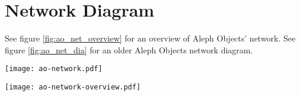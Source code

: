 \section{Network Diagram}
See figure \ref{fig:ao_net_overview} for an overview of Aleph Objects' network.
See figure \ref{fig:ao_net_dia} for an older Aleph Objects network diagram.

\begin{sidewaysfigure}[p]
\texttt{[image: ao-network.pdf]}
 \caption{Network Diagram}
 \label{fig:ao_net_dia}
\end{sidewaysfigure}

\begin{sidewaysfigure}[p]
\texttt{[image: ao-network-overview.pdf]}
 \caption{Aleph Objects Network Overview}
 \label{fig:ao_net_overview}
\end{sidewaysfigure}

